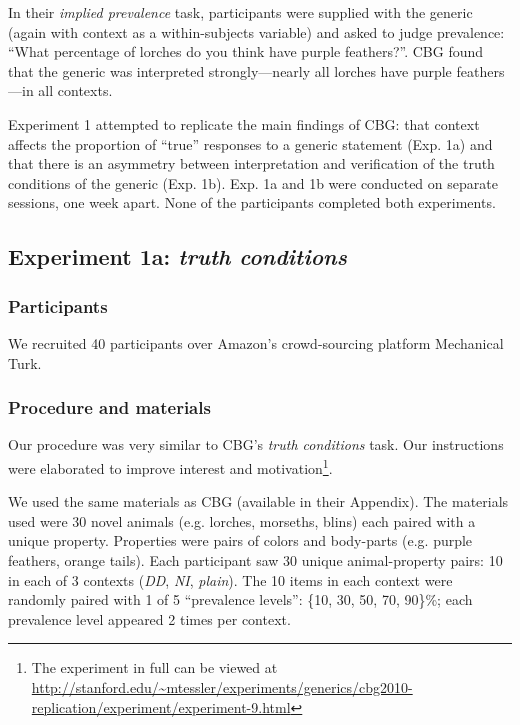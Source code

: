 \documentclass[10pt,letterpaper]{article}
\begin{document}
In their \emph{implied prevalence} task, participants were supplied with the generic (again with context as a within-subjects variable) and asked to judge prevalence: ``What percentage of lorches do you think have purple feathers?''. CBG found that the generic was interpreted strongly---nearly all lorches have purple feathers---in all contexts. 

Experiment 1 attempted to replicate the main findings of CBG: that context affects the proportion of ``true'' responses to a generic statement (Exp. 1a) and that there is an asymmetry between interpretation and verification of the truth conditions of the generic (Exp. 1b). 
Exp. 1a and 1b were conducted on separate sessions, one week apart. None of the participants completed both experiments.

\subsection{Experiment 1a: \emph{truth conditions}}

\subsubsection{Participants}

We recruited 40 participants over Amazon's crowd-sourcing platform Mechanical Turk.  

\subsubsection{Procedure and materials}

Our procedure was very similar to CBG's \emph{truth conditions} task. Our instructions were elaborated to improve interest and motivation\footnote{The experiment in full can be viewed at \url{http://stanford.edu/~mtessler/experiments/generics/cbg2010-replication/experiment/experiment-9.html}}. 

We used the same materials as CBG (available in their Appendix). The materials used were 30 novel animals (e.g. lorches, morseths, blins) each paired with a unique property. Properties were pairs of colors and body-parts (e.g. purple feathers, orange tails). Each participant saw 30 unique animal-property pairs: 10 in each of 3 contexts (\emph{DD}, \emph{NI}, \emph{plain}). The 10 items in each context were randomly paired with 1 of 5 ``prevalence levels'': \{10, 30, 50, 70, 90\}\%; each prevalence level appeared 2 times per context. 
\end{document}
